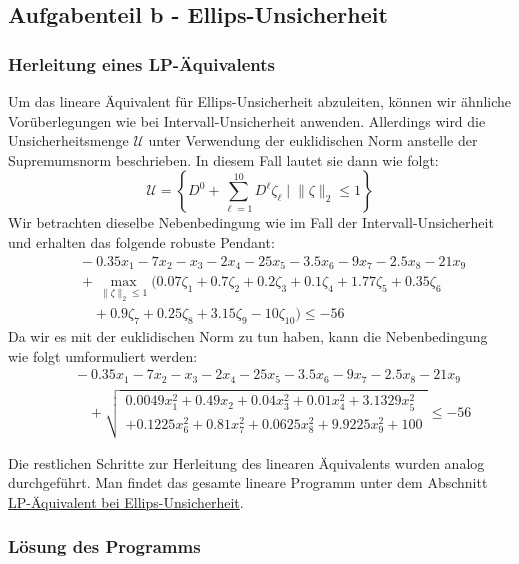\documentclass[a4paper,12pt]{article}
\begin{document}
\newpage

\subsection*{Aufgabenteil b - Ellips-Unsicherheit}

\subsubsection*{Herleitung eines LP-\"Aquivalents}

Um das lineare \"Aquivalent f\"ur Ellips-Unsicherheit abzuleiten, k\"onnen wir \"ahnliche Vor\"uberlegungen wie bei Intervall-Unsicherheit anwenden. Allerdings wird die Unsicherheitsmenge $\mathcal{U}$ unter Verwendung der euklidischen Norm anstelle der Supremumsnorm beschrieben. In diesem Fall lautet sie dann wie folgt:
\[
\mathcal{U} = \left\{ D^0 + \sum_{\ell=1}^{10}D^{\ell} \zeta_{\ell} \;\vert\; \|\zeta\|_2 \leq 1 \right\}
\]
Wir betrachten dieselbe Nebenbedingung wie im Fall der Intervall-Unsicherheit und erhalten das folgende robuste Pendant:
\[
\begin{aligned}
    &\quad -0.35x_1 - 7x_2 - x_3 - 2x_4 - 25x_5 - 3.5x_6 - 9x_7 - 2.5x_8 - 21x_9 \\
    &\quad + \max_{\|\zeta\|_2 \leq 1} \big( 0.07\zeta_1 + 0.7\zeta_2 + 0.2\zeta_3 + 0.1\zeta_4 + 1.77\zeta_5 +  0.35\zeta_6\\
    &\qquad + 0.9\zeta_7 + 0.25\zeta_8 + 3.15\zeta_9 - 10\zeta_{10} \big) \leq -56
\end{aligned}
\]
Da wir es mit der euklidischen Norm zu tun haben, kann die Nebenbedingung wie folgt umformuliert werden:
\[
\begin{aligned}
    &\quad -0.35x_1 - 7x_2 - x_3 - 2x_4 - 25x_5 - 3.5x_6 - 9x_7 - 2.5x_8 - 21x_9 \\
    &\qquad + \sqrt{
        \begin{aligned}0.0049x_1^2 + 0.49x_2 + 0.04x_3^2 + 0.01x_4^2 + 3.1329x_5^2 \\
            + 0.1225x_6^2 + 0.81x_7^2 + 0.0625x_8^2 + 9.9225x_9^2 + 100 \end{aligned}
            } \leq -56
\end{aligned}
\]

Die restlichen Schritte zur Herleitung des linearen \"Aquivalents wurden analog durchgef\"uhrt. Man findet das gesamte lineare Programm unter dem Abschnitt \hyperref[sec:lp-equivalent-ellips]{LP-\"Aquivalent bei Ellips-Unsicherheit}.

\subsubsection*{L\"osung des Programms}
\end{document}
